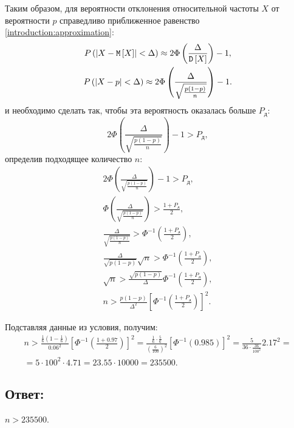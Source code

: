 Таким образом, для вероятности отклонения относительной частоты $X$ от вероятности $p$ справедливо приближенное равенство \eqref{introduction:approximation}:
\begin{gather}
    P \left ( \left | X - \mathtt{M} \left [ X \right ] \right | < \Delta \right ) \approx 2 \Phi \left ( \frac{\Delta}{\mathtt{D} \left [ X \right ]} \right ) - 1 , \\
    P \left ( \left | X - p \right | < \Delta \right ) \approx 2 \Phi \left ( \frac{\Delta}{\sqrt{\frac{p(1-p)}{n}}} \right ) - 1 .
\end{gather}
и необходимо сделать так, чтобы эта вероятность оказалась больше $P_\text{д}$:
\begin{equation}
    2 \Phi \left ( \frac{\Delta}{\sqrt{\frac{p(1-p)}{n}}} \right ) - 1 > P_\text{д} ,
\end{equation}
определив подходящее количество $n$:
\begin{gather}
    2 \Phi \left ( \frac{\Delta}{\sqrt{\frac{p(1-p)}{n}}} \right ) - 1 > P_\text{д} , \\
    \Phi \left ( \frac{\Delta}{\sqrt{\frac{p(1-p)}{n}}} \right ) > \frac{1 + P_\text{д}}{2} , \\
    \frac{\Delta}{\sqrt{\frac{p(1-p)}{n}}} > \Phi^{-1} \left ( \frac{1 + P_\text{д}}{2} \right ) , \\
    \frac{\Delta}{\sqrt{p(1-p)}} \sqrt{n} > \Phi^{-1} \left ( \frac{1 + P_\text{д}}{2} \right ) , \\
    \sqrt{n} > \frac{\sqrt{p(1-p)}}{\Delta} \Phi^{-1} \left ( \frac{1 + P_\text{д}}{2} \right ) , \\
    n > \frac{p(1-p)}{\Delta^2} \left [ \Phi^{-1} \left ( \frac{1 + P_\text{д}}{2} \right ) \right ]^2 .
\end{gather}

Подставляя данные из условия, получим:
\begin{multline}
    n >
    \frac{\frac{1}{6} \left ( 1 - \frac{1}{6} \right )}{0.06^2} \left [ \Phi^{-1} \left ( \frac{1 + 0.97}{2} \right ) \right ]^2
    = \frac{\frac{1}{6} \cdot \frac{5}{6}}{\left ( \frac{6}{100} \right )^2} \left [ \Phi^{-1} \left ( 0.985 \right ) \right ]^2
    = \frac{5}{36 \cdot \frac{36}{100^2}} 2.17^2 = \\
    = 5 \cdot 100^2 \cdot 4.71
    = 23.55 \cdot 10000
    = 235500 .
\end{multline}
\subsection*{Ответ:}
$n > 235500$.

